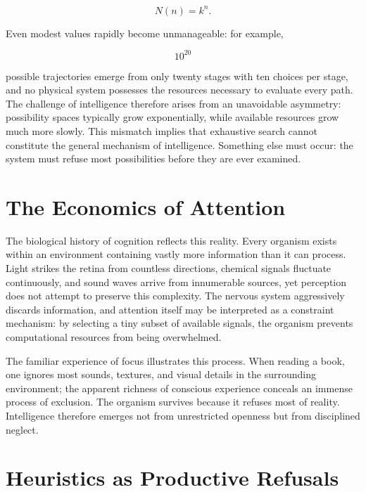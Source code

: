\documentclass[11pt,oneside]{book}
\theoremstyle{plain}
\theoremstyle{definition}
\theoremstyle{remark}
\begin{document}
\begin{equation}
N(n)=k^n.
\end{equation}

Even modest values rapidly become unmanageable: for example,

\begin{equation}
10^{20}
\end{equation}

possible trajectories emerge from only twenty stages with ten choices per stage, and no physical system possesses the resources necessary to evaluate every path. The challenge of intelligence therefore arises from an unavoidable asymmetry: possibility spaces typically grow exponentially, while available resources grow much more slowly. This mismatch implies that exhaustive search cannot constitute the general mechanism of intelligence. Something else must occur: the system must refuse most possibilities before they are ever examined.

\section{The Economics of Attention}

The biological history of cognition reflects this reality. Every organism exists within an environment containing vastly more information than it can process. Light strikes the retina from countless directions, chemical signals fluctuate continuously, and sound waves arrive from innumerable sources, yet perception does not attempt to preserve this complexity. The nervous system aggressively discards information, and attention itself may be interpreted as a constraint mechanism: by selecting a tiny subset of available signals, the organism prevents computational resources from being overwhelmed.

The familiar experience of focus illustrates this process. When reading a book, one ignores most sounds, textures, and visual details in the surrounding environment; the apparent richness of conscious experience conceals an immense process of exclusion. The organism survives because it refuses most of reality. Intelligence therefore emerges not from unrestricted openness but from disciplined neglect.

\section{Heuristics as Productive Refusals}
\end{document}

